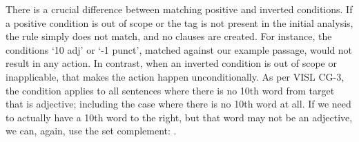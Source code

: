 There is a crucial difference between matching positive and inverted conditions.
If a positive condition is out of scope or the tag is not present in the initial analysis, the rule simply does not match, and no clauses are created. For instance, the conditions `10 adj' or `-1 punct', matched against our example passage, would not result in any action.
In contrast, when an inverted condition is out of scope or inapplicable, 
that makes the action happen unconditionally.
As per VISL CG-3, the condition  applies to all sentences where there is no 10th word from target that is adjective; including the case where there is no 10th word at all.
If we need to actually have a 10th word to the right, but that word may not be an adjective, we can, again, use the set complement: .





